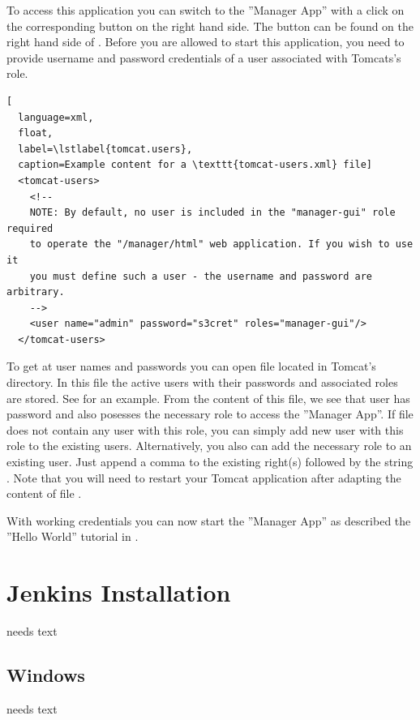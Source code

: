 \documentclass[a4paper,10pt,twoside]{book}
\begin{document}
To access this application you can switch to the ''Manager App'' with a click on the corresponding button on the right hand side.
The button can be found on the right hand side of .
Before you are allowed to start this application, you need to provide username and password credentials of a user associated with Tomcats's  role.

\begin{lstlisting}[
  language=xml,
  float,
  label=\lstlabel{tomcat.users},
  caption=Example content for a \texttt{tomcat-users.xml} file]
  <tomcat-users>
    <!--
    NOTE: By default, no user is included in the "manager-gui" role required
    to operate the "/manager/html" web application. If you wish to use it
    you must define such a user - the username and password are arbitrary.
    -->
	<user name="admin" password="s3cret" roles="manager-gui"/>
  </tomcat-users>	
\end{lstlisting}

To get at user names and passwords you can open file  located in Tomcat's  directory.
In this file the active users with their passwords and associated roles are stored.
See  for an example.
From the content of this file, we see that user  has password  and also posesses the necessary role  to access the ''Manager App''.
If file  does not contain any user with this role, you can simply add new user with this role to the existing users.
Alternatively, you also can add the necessary role to an existing user.
Just append a comma to the existing right(s) followed by the string .
Note that you will need to restart your Tomcat application after adapting the content of file .

With working credentials you can now start the ''Manager App'' as described the ''Hello World'' tutorial in .

\section{Jenkins Installation}
needs text

\subsection{Windows}
needs text
\end{document}
